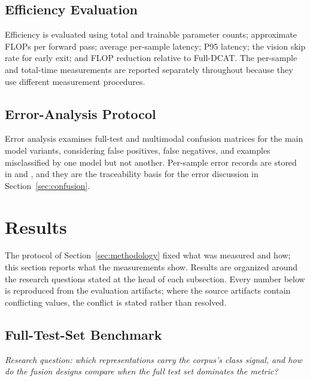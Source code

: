 \documentclass[10pt,twoside]{article}
\begin{document}
\subsection{Efficiency Evaluation}\label{sec:efficiency}

Efficiency is evaluated using total and trainable parameter counts; approximate FLOPs per forward pass; average per-sample latency; P95 latency; the vision skip rate for early exit; and FLOP reduction relative to Full-DCAT. The per-sample and total-time measurements are reported separately throughout because they use different measurement procedures.

\subsection{Error-Analysis Protocol}\label{sec:erroranalysis}

Error analysis examines full-test and multimodal confusion matrices for the main model variants, considering false positives, false negatives, and examples misclassified by one model but not another. Per-sample error records are stored in  and , and they are the traceability basis for the error discussion in Section~\ref{sec:confusion}.

\section{Results}\label{sec:results}

The protocol of Section~\ref{sec:methodology} fixed what was measured and how; this section reports what the measurements show. Results are organized around the research questions stated at the head of each subsection. Every number below is reproduced from the evaluation artifacts; where the source artifacts contain conflicting values, the conflict is stated rather than resolved.

\subsection{Full-Test-Set Benchmark}\label{sec:benchmark}

\emph{Research question: which representations carry the corpus's class signal, and how do the fusion designs compare when the full test set dominates the metric?}
\end{document}
